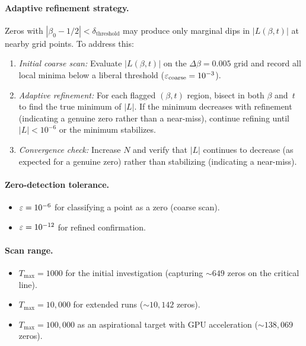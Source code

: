\paragraph{Adaptive refinement strategy.}
Zeros with $|\beta_0 - 1/2| < \delta_{\mathrm{threshold}}$ may produce only marginal
dips in $|L(\beta, t)|$ at nearby grid points. To address this:
\begin{enumerate}
  \item \emph{Initial coarse scan:} Evaluate $|L(\beta, t)|$ on the
        $\Delta\beta = 0.005$ grid and record all local minima below a liberal threshold
        ($\varepsilon_{\mathrm{coarse}} = 10^{-3}$).
  \item \emph{Adaptive refinement:} For each flagged $(\beta, t)$ region, bisect in both
        $\beta$ and~$t$ to find the true minimum of $|L|$. If the minimum decreases with
        refinement (indicating a genuine zero rather than a near-miss), continue refining
        until $|L| < 10^{-6}$ or the minimum stabilizes.
  \item \emph{Convergence check:} Increase $N$ and verify that $|L|$ continues to
        decrease (as expected for a genuine zero) rather than stabilizing (indicating a
        near-miss).
\end{enumerate}

\paragraph{Zero-detection tolerance.}
\begin{itemize}
  \item $\varepsilon = 10^{-6}$ for classifying a point as a zero (coarse scan).
  \item $\varepsilon = 10^{-12}$ for refined confirmation.
\end{itemize}

\paragraph{Scan range.}
\begin{itemize}
  \item $T_{\max} = 1000$ for the initial investigation (capturing $\sim 649$ zeros on
        the critical line).
  \item $T_{\max} = 10{,}000$ for extended runs ($\sim 10{,}142$ zeros).
  \item $T_{\max} = 100{,}000$ as an aspirational target with GPU acceleration
        ($\sim 138{,}069$ zeros).
\end{itemize}

